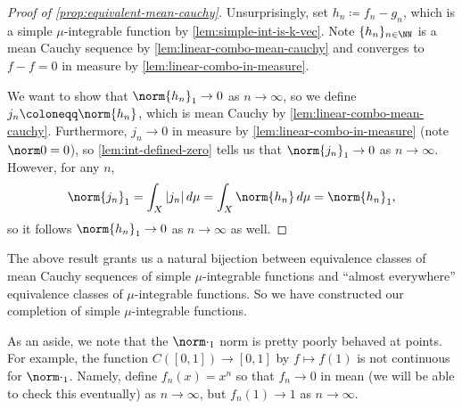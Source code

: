 \documentclass[../notes.tex]{subfiles}
\begin{document}
\begin{proof}[Proof of \autoref{prop:equivalent-mean-cauchy}]
	Unsurprisingly, set $h_n\coloneqq f_n-g_n$, which is a simple $\mu$-integrable function by \autoref{lem:simple-int-is-k-vec}. Note $\{h_n\}_{n\in\NN}$ is a mean Cauchy sequence by \autoref{lem:linear-combo-mean-cauchy} and converges to $f-f=0$ in measure by \autoref{lem:linear-combo-in-measure}.
	
	We want to show that $\norm{h_n}_1\to0$ as $n\to\infty$, so we define $j_n\coloneqq\norm{h_n}$, which is mean Cauchy by \autoref{lem:linear-combo-mean-cauchy}. Furthermore, $j_n\to0$ in measure by \autoref{lem:linear-combo-in-measure} (note $\norm0=0$), so \autoref{lem:int-defined-zero} tells us that $\norm{j_n}_1\to0$ as $n\to\infty$. However, for any $n$,
	\[\norm{j_n}_1=\int_X|j_n|\,d\mu=\int_X\norm{h_n}\,d\mu=\norm{h_n}_1,\]
	so it follows $\norm{h_n}_1\to0$ as $n\to\infty$ as well.
\end{proof}
\noindent The above result grants us a natural bijection between equivalence classes of mean Cauchy sequences of simple $\mu$-integrable functions and ``almost everywhere'' equivalence classes of $\mu$-integrable functions. So we have constructed our completion of simple $\mu$-integrable functions.
\begin{remark}
	As an aside, we note that the $\norm\cdot_1$ norm is pretty poorly behaved at points. For example, the function $C([0,1])\to[0,1]$ by $f\mapsto f(1)$ is not continuous for $\norm\cdot_1$. Namely, define $f_n(x)=x^n$ so that $f_n\to0$ in mean (we will be able to check this eventually) as $n\to\infty$, but $f_n(1)\to1$ as $n\to\infty$.
\end{remark}
\end{document}
